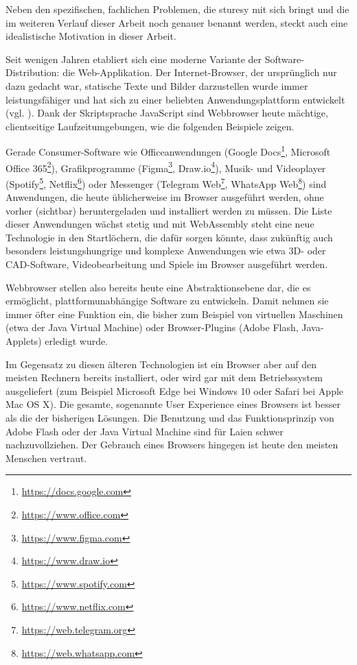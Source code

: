 Neben den spezifischen, fachlichen Problemen, die \ac{sturesy} mit sich bringt und die im weiteren Verlauf dieser Arbeit noch genauer benannt werden, steckt auch eine idealistische Motivation in dieser Arbeit.

Seit wenigen Jahren etabliert sich eine moderne Variante der Software-Distribution: die Web-Applikation. Der Internet-Browser, der ursprünglich nur dazu gedacht war, statische Texte und Bilder darzustellen wurde immer leistungsfähiger und hat sich zu einer beliebten Anwendungsplattform entwickelt (vgl. \cite[S. 1]{art:web1to4}). Dank der Skriptsprache JavaScript sind Webbrowser heute mächtige, clientseitige Laufzeitumgebungen, wie die folgenden Beispiele zeigen.

Gerade Consumer-Software wie Officeanwendungen (Google Docs\footnote{\url{https://docs.google.com}}, Microsoft Office 365\footnote{\url{https://www.office.com}}), Grafikprogramme (Figma\footnote{\url{https://www.figma.com}}, Draw.io\footnote{\url{https://www.draw.io}}), Musik- und Videoplayer (Spotify\footnote{\url{https://www.spotify.com}}, Netflix\footnote{\url{https://www.netflix.com}}) oder Messenger (Telegram Web\footnote{\url{https://web.telegram.org}}, WhatsApp Web\footnote{\url{https://web.whatsapp.com}}) sind Anwendungen, die heute üblicherweise im Browser ausgeführt werden, ohne vorher (sichtbar) heruntergeladen und installiert werden zu müssen. Die Liste dieser Anwendungen wächst stetig und mit WebAssembly steht eine neue Technologie in den Startlöchern, die dafür sorgen könnte, dass zukünftig auch besonders leistungshungrige und komplexe Anwendungen wie etwa 3D- oder CAD-Software, Videobearbeitung und Spiele im Browser ausgeführt werden.

Webbrowser stellen also bereits heute eine Abstraktionsebene dar, die es ermöglicht, plattformunabhängige Software zu entwickeln. Damit nehmen sie immer öfter eine Funktion ein, die bisher zum Beispiel von virtuellen Maschinen (etwa der Java Virtual Machine) oder Browser-Plugins (Adobe Flash, Java-Applets) erledigt wurde.

Im Gegensatz zu diesen älteren Technologien ist ein Browser aber auf den meisten Rechnern bereits installiert, oder wird gar mit dem Betriebssystem ausgeliefert (zum Beispiel Microsoft Edge bei Windows 10 oder Safari bei Apple Mac OS X). Die gesamte, sogenannte User Experience eines Browsers ist besser als die der bisherigen Lösungen.
Die Benutzung und das Funktionsprinzip von Adobe Flash oder der Java Virtual Machine sind für Laien schwer nachzuvollziehen. Der Gebrauch eines Browsers hingegen ist heute den meisten Menschen vertraut.

